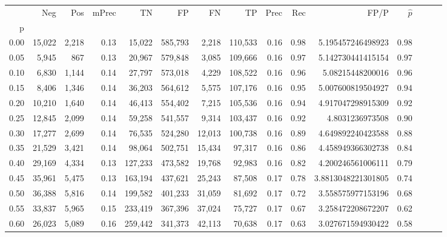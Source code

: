 \begin{tabular}{rrrrrrrrrrrrrrr}
\toprule
{} &      Neg &     Pos & mPrec &       TN &       FP &       FN &       TP &  Prec &   Rec &                 FP/P & $\hat{p}$ \\
p    &          &         &       &          &          &          &          &       &       &                      &           \\
\midrule
0.00 &   15,022 &   2,218 &  0.13 &   15,022 &  585,793 &    2,218 &  110,533 &  0.16 &  0.98 &    5.195457246498923 &      0.98 \\
0.05 &    5,945 &     867 &  0.13 &   20,967 &  579,848 &    3,085 &  109,666 &  0.16 &  0.97 &    5.142730441415154 &      0.97 \\
0.10 &    6,830 &   1,144 &  0.14 &   27,797 &  573,018 &    4,229 &  108,522 &  0.16 &  0.96 &     5.08215448200016 &      0.96 \\
0.15 &    8,406 &   1,346 &  0.14 &   36,203 &  564,612 &    5,575 &  107,176 &  0.16 &  0.95 &    5.007600819504927 &      0.94 \\
0.20 &   10,210 &   1,640 &  0.14 &   46,413 &  554,402 &    7,215 &  105,536 &  0.16 &  0.94 &    4.917047298915309 &      0.92 \\
0.25 &   12,845 &   2,099 &  0.14 &   59,258 &  541,557 &    9,314 &  103,437 &  0.16 &  0.92 &      4.8031236973508 &      0.90 \\
0.30 &   17,277 &   2,699 &  0.14 &   76,535 &  524,280 &   12,013 &  100,738 &  0.16 &  0.89 &    4.649892240423588 &      0.88 \\
0.35 &   21,529 &   3,421 &  0.14 &   98,064 &  502,751 &   15,434 &   97,317 &  0.16 &  0.86 &    4.458949366302738 &      0.84 \\
0.40 &   29,169 &   4,334 &  0.13 &  127,233 &  473,582 &   19,768 &   92,983 &  0.16 &  0.82 &    4.200246561006111 &      0.79 \\
0.45 &   35,961 &   5,475 &  0.13 &  163,194 &  437,621 &   25,243 &   87,508 &  0.17 &  0.78 &   3.8813048221301805 &      0.74 \\
0.50 &   36,388 &   5,816 &  0.14 &  199,582 &  401,233 &   31,059 &   81,692 &  0.17 &  0.72 &    3.558575977153196 &      0.68 \\
0.55 &   33,837 &   5,965 &  0.15 &  233,419 &  367,396 &   37,024 &   75,727 &  0.17 &  0.67 &    3.258472208672207 &      0.62 \\
0.60 &   26,023 &   5,089 &  0.16 &  259,442 &  341,373 &   42,113 &   70,638 &  0.17 &  0.63 &    3.027671594930422 &      0.58 \\

\end{tabular}
